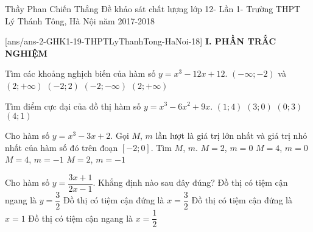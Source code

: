 \begin{name}
		{Thầy Phan Chiến Thắng}
		{Đề khảo sát chất lượng lớp 12- Lần 1- Trường THPT Lý Thánh Tông, Hà Nội năm 2017-2018}
	\end{name}
	\setcounter{ex}{0}
	[ans/ans-2-GHK1-19-THPTLyThanhTong-HaNoi-18]
\noindent\textbf{I. PHẦN TRẮC NGHIỆM}
\begin{ex}%
	Tìm các khoảng nghịch biến của hàm số $y=x^3-12x+12$.
	\choice
	{$\left(-\infty;-2\right)$ và $\left(2;+\infty\right)$}
	{\True $\left(-2;2\right)$}
	{$\left(-2;-\infty\right)$}
	{$\left(2;+\infty\right)$}
\end{ex}

\begin{ex}%
	Tìm điểm cực đại của đồ thị hàm số $y=x^3-6x^2+9x$.
	\choice
	{\True $(1;4)$}
	{$(3;0)$}
	{$(0;3)$}
	{$(4;1)$}
\end{ex}


\begin{ex}%
	Cho hàm số $y=x^3-3x+2$. Gọi $M$, $m$ lần lượt là giá trị lớn nhất và giá trị nhỏ nhất của hàm số đó trên đoạn $\left[-2;0\right]$. Tìm $M$, $m$.
	\choice
	{$M=2$, $m=0$}
	{\True $M=4$, $m=0$}
	{$M=4$, $m=-1$}
	{$M=2$, $m=-1$}
\end{ex}

\begin{ex}%
	Cho hàm số $y=\dfrac{3x+1}{2x-1}$. Khẳng định  nào sau đây đúng?
	\choice
	{\True Đồ thị có tiệm cận ngang là $y=\dfrac{3}{2}$}
	{Đồ thị có tiệm cận đứng là $x=\dfrac{3}{2}$}
	{Đồ thị có tiệm cận đứng là $x=1$}
	{Đồ thị có tiệm cận ngang là $x=\dfrac{1}{2}$}
\end{ex}

